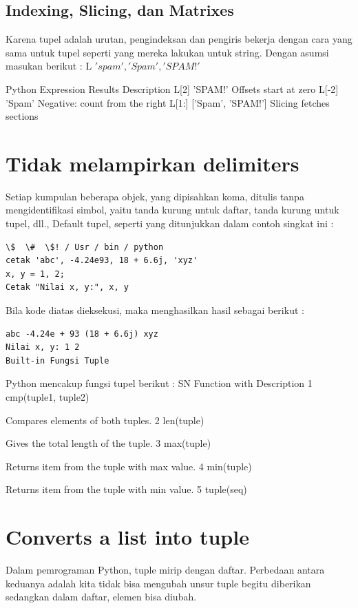 \subsection{Indexing, Slicing, dan Matrixes}
Karena tupel adalah urutan, pengindeksan dan pengiris bekerja dengan cara yang sama untuk tupel seperti yang mereka lakukan untuk string. Dengan asumsi masukan berikut : 
L \= \('spam', 'Spam', 'SPAM!'\)

Python Expression  Results   Description
L[2]  'SPAM!'  Offsets start at zero 
L[-2]  'Spam'  Negative: count from the right 
L[1:]  ['Spam', 'SPAM!'] Slicing fetches sections 

\section{Tidak melampirkan delimiters} 
Setiap kumpulan beberapa objek, yang dipisahkan koma, ditulis tanpa mengidentifikasi simbol, yaitu tanda kurung untuk daftar, tanda kurung untuk tupel, dll., Default tupel, seperti yang ditunjukkan dalam contoh singkat ini :
\begin{verbatim}
\$  \#  \$! / Usr / bin / python
cetak 'abc', -4.24e93, 18 + 6.6j, 'xyz'
x, y = 1, 2; 
Cetak "Nilai x, y:", x, y
\end{verbatim}
Bila kode diatas dieksekusi, maka menghasilkan hasil sebagai berikut :
\begin{verbatim}
abc -4.24e + 93 (18 + 6.6j) xyz
Nilai x, y: 1 2 
Built-in Fungsi Tuple 
\end{verbatim}
Python mencakup fungsi tupel berikut :
SN Function with Description 
1 cmp(tuple1, tuple2) 

Compares elements of both tuples. 
2  len(tuple) 

Gives the total length of the tuple. 
3  max(tuple) 

Returns item from the tuple with max value. 
4  min(tuple) 

Returns item from the tuple with min value. 
5  tuple(seq) 

\section{Converts a list into tuple} 
Dalam pemrograman Python, tuple mirip dengan daftar. Perbedaan antara keduanya adalah kita tidak bisa mengubah unsur tuple begitu diberikan sedangkan dalam daftar, elemen bisa diubah. 
